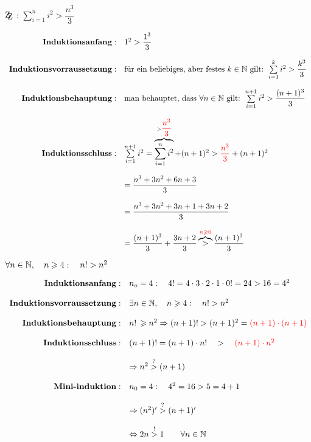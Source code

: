 \documentclass[main.tex]{subfiles}
\begin{document}
\begin{Beweis}
	$\zz$ : $\sum\limits_{i=1}^n i^2 > \dfrac{n^3}{3}$

	$\begin{array}{rl}
		\textbf{Induktionsanfang}: &  1^2 > \dfrac{1^3}{3}  \\\\
		\textbf{Induktionsvorraussetzung}: & \text{für ein beliebiges, aber festes } k \in \mathbb{N} \text{ gilt: } \sum \limits_{i=1}^k i^2  > \dfrac{k^3}{3} \\\\
		\textbf{Induktionsbehauptung}: & \text{man behauptet, dass } \forall n \in \mathbb{N} \text{ gilt: } \sum\limits_{i=1}^{n+1} i^2  > \dfrac{(n+1)^3}{3} \\\\
		\textbf{Induktionsschluss}: &  \sum\limits_{i=1}^{n+1} i^2 = \overbrace{\sum\limits_{i=1}^{n} i^2}^{>\textcolor{red}{\dfrac{n^3}{3}}} + (n+1)^2 > \textcolor{red}{\dfrac{n^3}{3}} +(n+1)^2 \\\\
		&= \dfrac{n^3+3n^2+6n+3}{3} \\\\
		&= \dfrac{n^3+3n^2+3n+1+3n+2}{3}  \\\\
		& = \dfrac{(n+1)^3}{3} + \dfrac{3n+2}{3} \overbrace{>}^{\textcolor{red}{n\geqslant0}} \dfrac{(n+1)^3}{3} 
	\end{array}$
\end{Beweis}


\begin{Beweis}
	$\forall n\in \mathbb{N},\quad n\geqslant 4 : \quad n! >n^2 $

	$\begin{array}{rl}
		\textbf{Induktionsanfang}: & n_{o}=4 : \quad 4! = 4\cdot3 \cdot 2 \cdot 1 \cdot 0! = 24>16=4^2 \\\\
		\textbf{Induktionsvorraussetzung}: & \exists n\in\mathbb{N}, \quad n\geqslant 4:\quad n!>n^2  \\\\
		\textbf{Induktionsbehauptung}: &  n!\,\geqslant n^2 \Rightarrow (n+1)! > (n+1)^2 = \textcolor{red}{ (n+1)\cdot(n+1)} \\\\
		\textbf{Induktionsschluss}: &  (n+1)! = (n+1)\cdot n ! \quad>\quad \textcolor{red}{ (n+1)\cdot n^2}  \\\\
		& \Rightarrow n^2 \overset{\mathrm{?}}{>} (n+1)  \\\\
		\textbf{Mini-induktion}: &n_{0}=4: \quad 4^2=16>5=4+1 \\\\
		& \Rightarrow (n^2)' \overset{\mathrm{?}}{>} (n+1)' \\\\
		&\Leftrightarrow 2n \overset{\mathrm{!}}{>} 1 \qquad \forall n \in \mathbb{N} \\
	\end{array}$
\end{Beweis}
\end{document}
